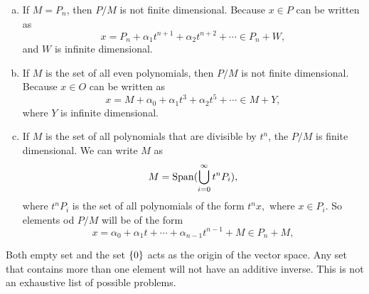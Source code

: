 \begin{problem}
	\begin{solution}
		\begin{enumerate}[(a)]
			\item If $ M = P_n $, then $ P/M $ is not finite dimensional. Because $ x \in P $ can be written as
			\[ x = P_n + \alpha_1 t^{n+1} + \alpha_2 t^{n+2} + \cdots \in P_n + W, \]
			and $ W $ is infinite dimensional.
			
			\item If $ M $ is the set of all even polynomials, then $ P/M $ is not finite dimensional. Because  $ x \in O $ can be written as
			\[ x = M + \alpha_0 + \alpha_1 t^3 + \alpha_2 t^5 + \cdots \in M + Y,  \]
			where $ Y $ is infinite dimensional.
			
			\item If $ M $ is the set of all polynomials that are divisible by $ t^n $, the $ P/M $ is finite dimensional. We can write $ M $ as
			\[ M = \operatorname{Span} (\bigcup_{i=0}^\infty t^n P_i), \]
			where $ t^nP_i $ is the set of all polynomials of the form $ t^n x, $ where $ x \in P_i $. So elements od $ P/M $ will be of the form
			\[ x = \alpha_0 + \alpha_1 t + \cdots + \alpha_{n-1}t^{n-1} + M \in P_n + M, \]
		\end{enumerate}
	\end{solution}
\end{problem}


\begin{problem}
	\begin{solution}
		Both empty set and the set $ \{0\} $ acts as the origin of the vector space. Any set that contains more than one element will not have an additive inverse. This is not an exhaustive list of possible problems.
	\end{solution}
\end{problem}


